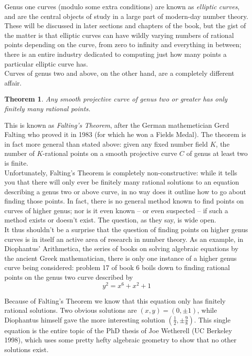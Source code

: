 \documentclass{book}
\theoremstyle{plain}
\newtheorem{theorem}{Theorem}[section]
\theoremstyle{definition}
\numberwithin{equation}{section}
\numberwithin{figure}{section}
\numberwithin{table}{section}
\begin{document}
Genus one curves (modulo some extra conditions) are known as {\it elliptic curves}, and are the central objects of study in a large part of modern-day number theory. These will be discussed in later sections and chapters of the book, but the gist of the matter is that elliptic curves can have wildly varying numbers of rational points depending on the curve, from zero to infinity and everything in between; there is an entire industry dedicated to computing just how many points a particular elliptic curve has. \\

Curves of genus two and above, on the other hand, are a completely different affair.

\begin{theorem}
Any smooth projective curve of genus two or greater has only finitely many rational points.
\end{theorem}

This is known as {\it Falting's Theorem}, after the German mathemetician Gerd Falting who proved it in 1983 (for which he won a Fields Medal). The theorem is in fact more general than stated above: given any fixed number field $K$, the number of $K$-rational points on a smooth projective curve $C$ of genus at least two is finite. \\

Unfortunately, Falting's Theorem is completely non-constructive: while it tells you that there will only ever be finitely many rational solutions to an equation describing a genus two or above curve, in no way does it outline how to go about finding those points. In fact, there is no general method known to find points on curves of higher genus; nor is it even known -- or even suspected -- if such a method exists or doesn't exist. The question, as they say, is wide open. \\

It thus shouldn't be a surprise that the question of finding points on higher genus curves is in itself an active area of research in number theory. As an example, in Diophantus' Arithmetica, the series of books on solving algebraic equations by the ancient Greek mathematician, there is only one instance of a higher genus curve being considered: problem 17 of book 6 boils down to finding rational points on the genus two curve described by
\[ y^2 = x^6 + x^2 + 1 \]

Because of Falting's Theorem we know that this equation only has finitely rational solutions. Two obvious solutions are $(x,y) = (0,\pm 1)$, while Diophantus himself gave the more interesting solution $(\frac{1}{2},\pm \frac{9}{8})$. This single equation is the entire topic of the PhD thesis of Joe Wetherell (UC Berkeley 1998), which uses some pretty hefty algebraic geometry to show that no other solutions exist. \\
\end{document}
